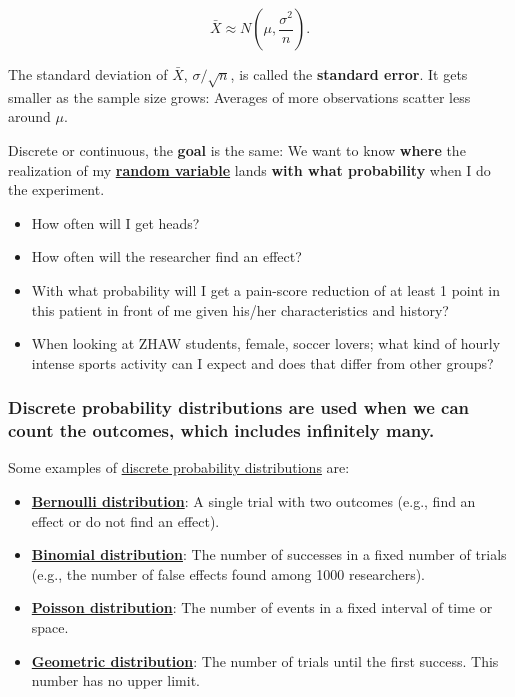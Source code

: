 \documentclass[
]{book}
\providecommand{\tightlist}{%
  \setlength{\itemsep}{0pt}\setlength{\parskip}{0pt}}
\begin{document}
\[\bar{X} \approx N\left(\mu, \frac{\sigma^2}{n}\right).\]

The standard deviation of \(\bar{X}\), \(\sigma/\sqrt{n}\), is called the \textbf{standard error}. It gets smaller as the sample size grows:
Averages of more observations scatter less around \(\mu\).

Discrete or continuous, the \textbf{goal} is the same: We want to know \textbf{where} the realization
of my \textbf{\href{https://www.youtube.com/watch?v=Y9nsL69CwbU&t=18s&ab_channel=VeryNormal}{random variable}}
lands \textbf{with what probability} when I do the experiment.

\begin{itemize}
\item
  How often will I get heads?
\item
  How often will the researcher find an effect?
\item
  With what probability will I get a pain-score reduction of at least 1 point in this patient in front of me given his/her
  characteristics and history?
\item
  When looking at ZHAW students, female, soccer lovers; what kind of hourly intense sports activity
  can I expect and does that differ from other groups?
\end{itemize}

\subsubsection{Discrete probability distributions are used when we can count the outcomes, which includes infinitely many.}\label{discrete_probability_distributions}

Some examples of \href{https://en.wikipedia.org/wiki/Probability_distribution\#Discrete_probability_distribution}{discrete probability distributions} are:

\begin{itemize}
\tightlist
\item
  \textbf{\href{https://en.wikipedia.org/wiki/Bernoulli_distribution}{Bernoulli distribution}}: A single trial with two outcomes (e.g., find an effect or do not find an effect).
\item
  \textbf{\href{https://en.wikipedia.org/wiki/Binomial_distribution}{Binomial distribution}}: The number of successes in a fixed number of trials (e.g., the number of false effects found among 1000 researchers).
\item
  \textbf{\href{https://en.wikipedia.org/wiki/Poisson_distribution}{Poisson distribution}}: The number of events in a fixed interval of time or space.
\item
  \textbf{\href{https://en.wikipedia.org/wiki/Geometric_distribution}{Geometric distribution}}: The number of trials until the first success. This number has no upper limit.
\end{itemize}
\end{document}
